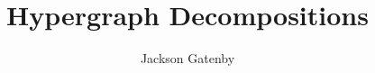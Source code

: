 



\title{Hypergraph Decompositions}
\author{Jackson Gatenby}
\maketitle

\tableofcontents











